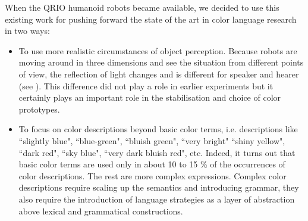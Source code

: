 When the QRIO humanoid robots became available, we decided to use this existing work for pushing forward the state of 
the art in color language research in two ways:
\begin{itemize}
\item To use more realistic circumstances of object perception. Because 
robots are moving around in three dimensions and see the situation from different points of view, the reflection 
of light changes and is different for speaker and hearer (see ). This difference did not 
play a role in earlier experiments but 
it certainly plays an important role in the stabilisation and choice of color prototypes. 
\item To focus on color descriptions beyond basic color terms, i.e. descriptions like 
``slightly blue", ``blue-green", ``bluish green", ``very bright" ``shiny yellow", ``dark red", ``sky blue", 
``very dark bluish red", etc. Indeed, it turns out that 
basic color terms are used only in about 10 to 15 \% of the occurrences of color descriptions. The rest are 
more complex expressions. Complex color descriptions require scaling up the semantics and introducing grammar, they 
also require the introduction of language strategies as a layer of abstraction 
above lexical and grammatical constructions. 
\end{itemize}

